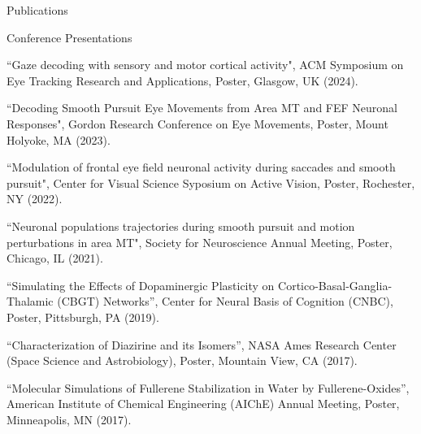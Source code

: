 \documentclass{resume} %
\begin{document}
\begin{rSection}{Publications}
\begin{rSubsection4}{Conference Presentations}{}{}{}
\item “Gaze decoding with sensory and motor cortical activity", ACM Symposium on Eye Tracking Research and Applications, Poster, Glasgow, UK (2024).
\item “Decoding Smooth Pursuit Eye Movements from Area MT and FEF Neuronal Responses", Gordon Research Conference on Eye Movements, Poster, Mount Holyoke, MA (2023).
\item “Modulation of frontal eye field neuronal activity during saccades and smooth pursuit", Center for Visual Science Syposium on Active Vision, Poster, Rochester, NY (2022).
\item “Neuronal populations trajectories during smooth pursuit and motion perturbations in area MT", Society for Neuroscience Annual Meeting, Poster, Chicago, IL (2021). 
\item “Simulating the Effects of Dopaminergic Plasticity on Cortico-Basal-Ganglia-Thalamic (CBGT) Networks”, Center for Neural Basis of Cognition (CNBC), Poster, Pittsburgh, PA (2019).
\item “Characterization of Diazirine and its Isomers”, NASA Ames Research Center (Space Science and Astrobiology), Poster, Mountain View, CA (2017).
\item “Molecular Simulations of Fullerene Stabilization in Water by Fullerene-Oxides”, American Institute of Chemical Engineering (AIChE) Annual Meeting, Poster, Minneapolis, MN (2017).
\end{rSubsection4}
\end{rSection}

\end{document}
